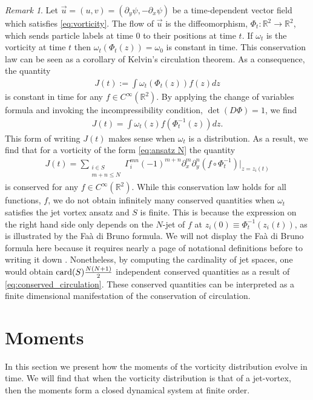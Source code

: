 \documentclass[12pt]{amsart}
\newcommand{\R}{\ensuremath{\mathbb{R}}}
\theoremstyle{remark}
\newtheorem{rmk}[thm]{Remark}
\begin{document}
\begin{rmk} \label{rmk:Kelvin}
	Let $\vec{u} = (u,v) = (\partial_y \psi, - \partial_x \psi)$ be a time-dependent vector field which satisfies \eqref{eq:vorticity}.
	The flow of $\vec{u}$ is the diffeomorphism, $\Phi_t: \mathbb{R}^2 \to \mathbb{R}^2$,
	which sends particle labels at time $0$ to their positions at time $t$.
	If $\omega_t$ is the vorticity at time $t$ then $\omega_t( \Phi_t(z) ) = \omega_0$ is constant in time.
	This conservation law can be seen as a corollary of Kelvin's circulation theorem.
	As a consequence, the quantity
	\begin{align*}
		J(t) := \int \omega_t( \Phi_t(z) ) f(z) dz
	\end{align*}
	is constant in time for any $f \in C^\infty(\R^2)$.
	By applying the change of variables formula and invoking the
	incompressibility condition, $\det(D\Phi) = 1$, we find
	\begin{align*}
		J(t) = \int \omega_t( z) f(\Phi_t^{-1}(z)) dz.
	\end{align*}
	This form of writing $J(t)$ makes sense when $\omega_t$ is a distribution.
	As a result, we find that for a vorticity of the form \eqref{eq:ansatz N} the quantity
	\begin{align}
		J(t) = \sum_{
			\substack{
				i \in S \\
				m+n \leq N
			}
		} \Gamma_i^{mn} (-1)^{m+n} \partial_x^m\partial_y^n( f \circ \Phi_t^{-1}) |_{z = z_i(t)} \label{eq:conserved_circulation}
	\end{align}
	is conserved for any $f \in C^\infty(\R^2)$.
	While this conservation law holds for all functions, $f$, we do not obtain infinitely many conserved
	quantities when $\omega_t$ satisfies the jet vortex ansatz and $S$ is finite.
	This is because the expression on the right hand side only depends on the $N$-jet of $f$ at $z_i(0) \equiv \Phi_t^{-1}(z_i(t) )$,
	as is illustrated by the Fa\`a di Bruno formula.
	We will not display the Fa\`a di Bruno formula here because it requires nearly a page of notational definitions before to writing it down
	\cite{ConstantineSavits1996}.
	Nonetheless, by computing the cardinality of jet spaces, one would obtain ${\rm card}(S) \frac{ N(N+1)}{2}$ independent conserved quantities
	as a result of \eqref{eq:conserved_circulation}.
	These conserved quantities can be interpreted as a finite dimensional manifestation of the conservation of circulation.
\end{rmk}

\section{Moments}
\label{sec:moments}
	In this section we present how the moments of the vorticity distribution evolve in time.
	We will find that when the vorticity distribution is that of a jet-vortex, then the moments form a closed dynamical system at finite order.
	
\end{document}
